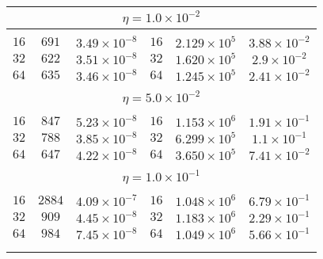 \documentclass[10pt]{article}
\begin{document}
\begin{table}[]
\begin{center}
\begin{tabular}{@{}ccc|ccc@{}}
\multicolumn{6}{c}{$\eta = 1.0\times 10^{-2}$} \\[5pt]
\hline\\[-11pt]
$16$ & $691$ & $3.49\times 10^{-8}$  &  $16$ & $2.129\times 10^{5}$ & $3.88\times 10^{-2}$  \\ [1pt]
$32$ & $622$ & $3.51\times 10^{-8}$  &  $32$ & $1.620\times 10^{5}$ & $2.9\times 10^{-2}$   \\ [1pt]
$64$ & $635$ & $3.46\times 10^{-8}$  &  $64$ & $1.245\times 10^{5}$ & $2.41\times 10^{-2}$  \\ [1pt]
\hline\\[-11pt]

\multicolumn{6}{c}{$\eta = 5.0\times 10^{-2}$} \\[5pt]
\hline\\[-11pt]
$16$ & $847$ & $5.23\times 10^{-8}$  &  $16$ & $1.153\times 10^{6}$ & $1.91\times 10^{-1}$ \\ [1pt]
$32$ & $788$ & $3.85\times 10^{-8}$  &  $32$ & $6.299\times 10^{5}$ & $1.1\times 10^{-1}$   \\ [1pt]
$64$ & $647$ & $4.22\times 10^{-8}$  &  $64$ & $3.650\times 10^{5}$ & $7.41\times 10^{-2}$  \\ [1pt]
\hline\\[-11pt]

\multicolumn{6}{c}{$\eta = 1.0\times 10^{-1}$} \\[5pt]
\hline\\[-11pt]
$16$ & $2884$ & $4.09\times 10^{-7}$ &  $16$ & $1.048\times 10^{6}$ & $6.79\times 10^{-1}$ \\ [1pt]
$32$ & $909$ & $4.45\times 10^{-8}$  &  $32$ & $1.183\times 10^{6}$ & $2.29\times 10^{-1}$ \\ [1pt]
$64$ & $984$ & $7.45\times 10^{-8}$  &  $64$ & $1.049\times 10^{6}$ & $5.66\times 10^{-1}$ \\ [1pt]

\hline\\[-11pt]


\hline\\[-8pt]
\end{tabular}\\[5pt]
\end{center}
\normalsize
\end{table}
\end{document}
